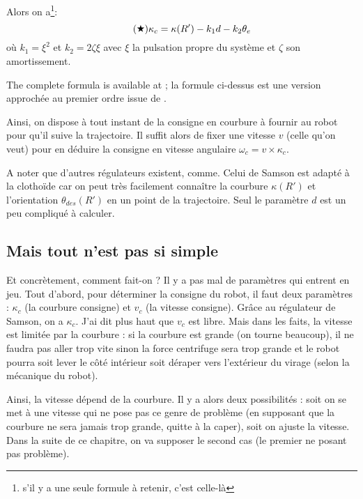 \documentclass[11pt]{article}
\begin{document}
    Alors on a\footnote{s'il y a une seule formule à retenir, c'est celle-là}:
    \begin{equation}
        \tag{\ding{72}}
        \kappa_c = \kappa(R') - k_1d - k_2\theta_e
        \label{equ:samson}
    \end{equation}
    où $k_1 = \xi^2$ et $k_2 = 2\zeta\xi$ avec $\xi$ la pulsation propre du système et $\zeta$ son amortissement.

    The complete formula is available at\cite{samson,samson1995control} ; la formule ci-dessus est une version approchée au premier ordre issue de \cite{gauthier1999utilisation}.

    Ainsi, on dispose à tout instant de la consigne en courbure à fournir au robot pour qu'il suive la trajectoire. Il suffit alors de fixer une vitesse $v$ (celle qu'on veut) pour en déduire la consigne en vitesse angulaire $\omega_c = v \times \kappa_c$.

    A noter que d'autres régulateurs existent, comme\cite{koh1999smooth}. Celui de Samson est adapté à la clothoïde car on peut très facilement connaître la courbure $\kappa(R')$ et l'orientation $\theta_{des}(R')$ en un point de la trajectoire. Seul le paramètre $d$ est un peu compliqué à calculer.

    \subsection{Mais tout n'est pas si simple}

    Et concrètement, comment fait-on ? Il y a pas mal de paramètres qui entrent en jeu. Tout d'abord, pour déterminer la consigne du robot, il faut deux paramètres : $\kappa_c$ (la courbure consigne) et $v_c$ (la vitesse consigne). Grâce au régulateur de Samson, on a $\kappa_c$. J'ai dit plus haut que $v_c$ est libre. Mais dans les faits, la vitesse est limitée par la courbure : si la courbure est grande (on tourne beaucoup), il ne faudra pas aller trop vite sinon la force centrifuge sera trop grande et le robot pourra soit lever le côté intérieur soit déraper vers l'extérieur du virage (selon la mécanique du robot).

    Ainsi, la vitesse dépend de la courbure. Il y a alors deux possibilités : soit on se met à une vitesse qui ne pose pas ce genre de problème (en supposant que la courbure ne sera jamais trop grande, quitte à la caper), soit on ajuste la vitesse. Dans la suite de ce chapitre, on va supposer le second cas (le premier ne posant pas problème).
\end{document}
